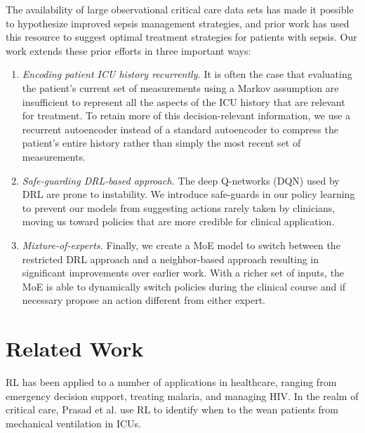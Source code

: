 \documentclass[10pt]{amia}
\begin{document}
The availability of large observational critical care data sets \cite{johnson2016mimic} has made it possible to hypothesize improved sepsis management strategies, and prior work\cite{DBLP:journals/corr/RaghuKCSG17,komorowski2016markov} has used this resource to suggest optimal treatment strategies for patients with sepsis.  Our work extends these prior efforts in three important ways:

\begin{enumerate}

\item \textit{Encoding patient ICU history recurrently.} It is often the case that evaluating the patient's current set of measurements using a Markov assumption are insufficient to represent all the aspects of the ICU history that are relevant for treatment.  To retain more of this decision-relevant information, we use a recurrent autoencoder instead of a standard autoencoder to compress the patient's entire history rather than simply the most recent set of measurements.

\item \textit{Safe-guarding DRL-based approach.} The deep Q-networks (DQN) used by DRL are prone to instability. We introduce safe-guards in our policy learning to prevent our models from suggesting actions rarely taken by clinicians, moving us toward policies that are more credible for clinical application.

\item \textit{Mixture-of-experts.} Finally, we create a MoE model to switch between the restricted DRL approach and a neighbor-based approach resulting in significant improvements over earlier work. With a richer set of inputs, the MoE is able to dynamically switch policies during the clinical course and if necessary propose an action different from either expert. 

\end{enumerate}

\section*{Related Work}

RL has been applied to a number of applications in healthcare, ranging from emergency decision support,\cite{thapa2005agent} treating malaria, \cite{rajpurkar2017malaria} and managing HIV.\cite{parbhoo2014reinforcement}  In the realm of critical care, Prasad et al.\cite{prasad2017reinforcement} use RL to identify when to the wean patients from mechanical ventilation in ICUs. 
\end{document}
